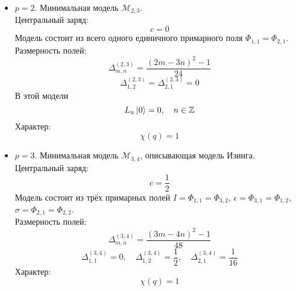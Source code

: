 \documentclass[12pt]{article}
\theoremstyle{definition}
\begin{document}
\begin{itemize}
    \item $p=2$. Минимальная модель $\mathcal{M}_{2,3}$.\\
    Центральный заряд:
    \begin{equation}
        c=0
    \end{equation}
    Модель состоит из всего одного единичного примарного поля $\Phi_{1,1}=\Phi_{2,1}$.\\
    Размерность полей:
    \begin{equation}
        \Delta^{(2,3)}_{m,n}=\frac{(2m-3n)^2-1}{24}
    \end{equation}
    \begin{equation}
        \Delta^{(2,3)}_{1,2}=\Delta^{(2,3)}_{2,1}=0
    \end{equation}
    В этой модели
    \begin{equation}
        L_n\ket{0}=0,\quad n\in\mathbb{Z}
    \end{equation}
    Характер:
    \begin{equation}
        \chi(q)=1
    \end{equation}
    \item $p=3$. Минимальная модель $\mathcal{M}_{3,4}$, описывающая модель Изинга.\\
    Центральный заряд:
    \begin{equation}
        c=\frac{1}{2}
    \end{equation}
    Модель состоит из трёх примарных полей $I=\Phi_{1,1}=\Phi_{3,2}$, $\epsilon=\Phi_{3,1}=\Phi_{1,2}$, $\sigma=\Phi_{2,1}=\Phi_{2,2}$.\\
    Размерность полей:
    \begin{equation}
        \Delta^{(3,4)}_{m,n}=\frac{(3m-4n)^2-1}{48}
    \end{equation}
    \begin{equation}
        \Delta^{(3,4)}_{1,1}=0,\quad\Delta^{(3,4)}_{1,2}=\frac{1}{2},\quad\Delta^{(3,4)}_{2,1}=\frac{1}{16}
    \end{equation}
    Характер:
    \begin{equation}
        \chi(q)=1
    \end{equation}
\end{itemize}
\end{document}

